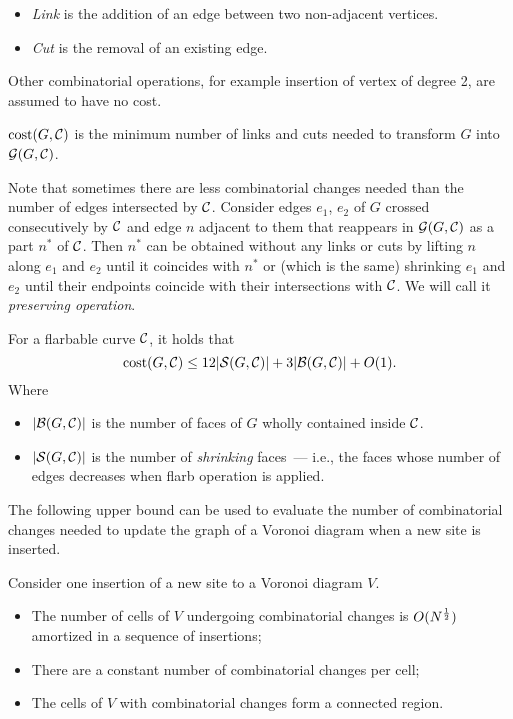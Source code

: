 \documentclass[a4paper,11pt]{article}
\begin{document}
\begin{itemize}
	\item \emph{Link} is the addition of an edge between two non-adjacent vertices.
	\item \emph{Cut} is the removal of an existing edge.
\end{itemize}

Other combinatorial operations, for example insertion of vertex of degree 2, are assumed to have no cost.

\begin{definition}
	$\operatorname{cost} (G, \mathcal C)$ is the minimum number of links and cuts needed to transform $G$ into $\mathcal G (G, \mathcal C)$.
\end{definition}

Note that sometimes there are less combinatorial changes needed than the number of edges intersected by $\mathcal C$. Consider edges $e_1$, $e_2$ of $G$ crossed consecutively by $\mathcal C$ and edge $n$ adjacent to them that reappears in $\mathcal G (G, \mathcal C)$ as a part $n^*$ of $\mathcal C$. Then $n^*$ can be obtained without any links or cuts by lifting $n$ along $e_1$ and $e_2$ until it coincides with $n^*$ or (which is the same) shrinking $e_1$ and $e_2$ until their endpoints coincide with their intersections with $\mathcal C$. We will call it {\itshape preserving operation}.


\begin{theorem}
	For a flarbable curve $\mathcal C$, it holds that \[ \operatorname{cost} (G, \mathcal C) \le 12|\mathcal S (G, \mathcal C)| + 3|\mathcal B (G, \mathcal C)| + O(1). \]
	Where
	\begin{itemize}
		\item $|\mathcal B (G, \mathcal C)|$ is the number of faces of $G$ wholly contained inside $\mathcal C$.
		\item $|\mathcal S (G, \mathcal C)|$ is the number of \emph{shrinking} faces~— i.e., the faces whose number of edges decreases when flarb operation is applied.
	\end{itemize}
\end{theorem}

The following upper bound can be used to evaluate the number of combinatorial changes needed to update the graph of a Voronoi diagram when a new site is inserted.

\begin{theorem} 
	Consider one insertion of a new site to a Voronoi diagram $V$\!\!.
\begin{itemize}
	\item The number of cells of $V$\!\! undergoing combinatorial changes is $O(N^\frac{1}{2} )$ amortized in a sequence of insertions;
	\item There are a constant number of combinatorial changes per cell;
	\item The cells of $V$\!\! with combinatorial changes form a connected region.
\end{itemize}
\end{theorem}
\end{document}
